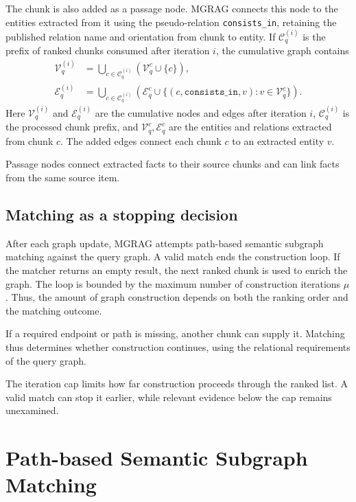 The chunk is also added as a passage node. MGRAG connects this node to the entities extracted from it using the pseudo-relation \texttt{consists\_in}, retaining the published relation name and orientation from chunk to entity. If $\mathcal C_q^{(i)}$ is the prefix of ranked chunks consumed after iteration $i$, the cumulative graph contains
\begin{align}
 \mathcal V_q^{(i)}
 &=\bigcup_{c\in\mathcal C_q^{(i)}}(\mathcal V_q^c\cup\{c\}),\\
 \mathcal E_q^{(i)}
 &=\bigcup_{c\in\mathcal C_q^{(i)}}\left(\mathcal E_q^c\cup
 \{(c,\texttt{consists\_in},v):v\in\mathcal V_q^c\}\right).
\label{eq:mgrag:graph-union}
\end{align}
Here $\mathcal V_q^{(i)}$ and $\mathcal E_q^{(i)}$ are the cumulative nodes and edges after iteration $i$, $\mathcal C_q^{(i)}$ is the processed chunk prefix, and $\mathcal V_q^c,\mathcal E_q^c$ are the entities and relations extracted from chunk $c$. The added edges connect each chunk $c$ to an extracted entity $v$.

Passage nodes connect extracted facts to their source chunks and can link facts from the same source item.

\subsection{Matching as a stopping decision}

After each graph update, MGRAG attempts path-based semantic subgraph matching against the query graph. A valid match ends the construction loop. If the matcher returns an empty result, the next ranked chunk is used to enrich the graph. The loop is bounded by the maximum number of construction iterations $\mu$. Thus, the amount of graph construction depends on both the ranking order and the matching outcome.

If a required endpoint or path is missing, another chunk can supply it. Matching thus determines whether construction continues, using the relational requirements of the query graph.

The iteration cap limits how far construction proceeds through the ranked list. A valid match can stop it earlier, while relevant evidence below the cap remains unexamined.

\section{Path-based Semantic Subgraph Matching}
\label{sec:mgrag:matching}

